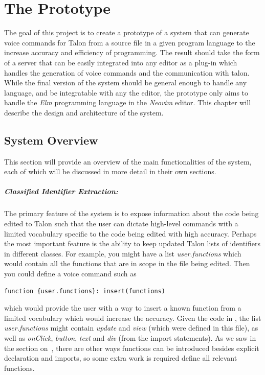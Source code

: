 \documentclass[../thesis.tex]{subfiles}
\begin{document}
\chapter{The Prototype}\label{the_project}
The goal of this project is to create a prototype of a system that can generate voice commands
for Talon from a source file in a given program language to the increase accuracy and efficiency of programming.
The result should take the form of a server that can be easily integrated into any editor as a plug-in
which handles the generation of voice commands and the communication with talon.
While the final version of the system should be general enough to handle any language, and be integratable with any the editor,
the prototype only aims to handle the \textit{Elm} programming language in the \textit{Neovim} editor.
This chapter will describe the design and architecture of the system.

\section{System Overview}%
\label{sec:voice_command_generation}
This section will provide an overview of the main functionalities of the system,
each of which will be discussed in more detail in their own sections.

\paragraph{Classified Identifier Extraction:}%
\label{par:classified_identifier_extraction}
The primary feature of the system is to expose information about the code being edited
to Talon such that the user can dictate high-level commands with a limited vocabulary
specific to the code being edited with high accuracy.
Perhaps the most important feature is the ability to keep updated Talon lists
of identifiers in different classes. For example, you might have a list \textit{user.functions} which would contain
all the functions that are in scope in the file being edited.
Then you could define a voice command such as 
\begin{verbatim}
function {user.functions}: insert(functions)
\end{verbatim} 
which would provide the user with a way to insert a known function from a limited vocabulary which would increase the accuracy.
Given the code in , the list \textit{user.functions} might contain \textit{update} and \textit{view}
(which were defined in this file), as well as \textit{onClick}, \textit{button}, \textit{text} and \textit{div} (from the import statements).
As we saw in the section on~, there are other ways functions can be introduced
besides explicit declaration and imports, so some extra work is required define all relevant functions.
\end{document}
